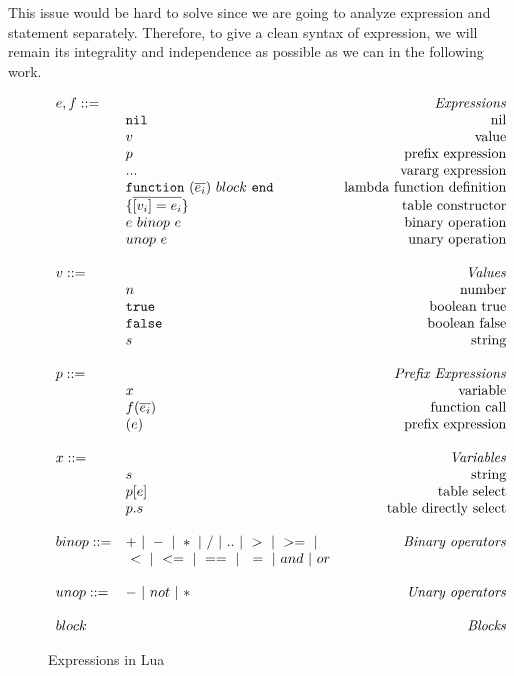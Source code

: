 This issue would be hard to solve since we are going to analyze expression and statement separately. Therefore, to give a clean syntax of expression, we will remain its integrality and independence as possible as we can in the following work.



\newcommand{\mydefhead}[2]{\multicolumn{2}{l}{{#1}}&\mbox{\emph{#2}}\\}
\newcommand{\mydefcase}[2]{\qquad\qquad& #1 &\mbox{#2}\\}

\newcommand{\functiondef}[2]{\mbox{\tt function}~(\overline{#1_i})~#2~ {\tt end}}


\begin{figure}
\caption{Expressions in Lua}
\label{fig:LuaExp}
\[
\begin{array}{llr}
  \mydefhead{e,f ::=\qquad\qquad\qquad\qquad}{Expressions}
  \mydefcase{\tt nil}{nil}
  \mydefcase{v}{value}
  \mydefcase{p}{prefix expression}
  \mydefcase{\tt ...}{vararg expression}
  \mydefcase{\functiondef e {block}}{lambda function definition}
  \mydefcase{\{\overline{[v_i] = e_i}\}}{table constructor}
  \mydefcase{e ~binop~ e}{binary operation}
  \mydefcase{unop~ e}{unary operation}
  \\
  \mydefhead{v ::=\qquad\qquad\qquad\qquad}{Values}
  \mydefcase{n}{number}
  \mydefcase{\tt true}{boolean true}
  \mydefcase{\tt false}{boolean false}
  \mydefcase{s}{string}
  \\
  \mydefhead{p ::=\qquad\qquad\qquad\qquad}{Prefix Expressions}
  \mydefcase{x}{variable}
  \mydefcase{f(\overline{e_i})}{function call}
  \mydefcase{(e)}{prefix expression}
  
  \\
  \mydefhead{x ::=\qquad\qquad\qquad\qquad}{Variables}
  \mydefcase{s}{string}
  \mydefcase{p[e]}{table select}
  \mydefcase{p.s}{table directly select}
  \\
  binop ::= & + ~|~ - ~|~ * ~|~ / ~|~ .. ~|~ > ~|~ >= ~|& \mbox{\emph{Binary operators}}\\
  \quad & ~ < ~|~ <= ~|~ == ~|~ ~= ~|~ and ~|~ or &  \\
  \\
  unop ::= & - ~|~ not ~|~ *  & \mbox{\emph{Unary operators}} \\
  \\
  \mydefhead{block \qquad\qquad\qquad\qquad}{Blocks}
\end{array}
\]
\end{figure}



